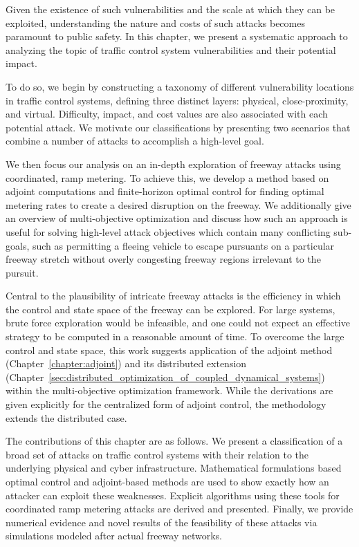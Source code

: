 Given the existence of such vulnerabilities and the scale at which they can be exploited, understanding the nature and costs of such attacks becomes paramount to public safety. In this chapter, we present a systematic approach to analyzing the topic of traffic control system vulnerabilities and their potential impact.

To do so, we begin by constructing a taxonomy of different vulnerability locations in traffic control systems, defining three distinct layers: physical, close-proximity, and virtual. Difficulty, impact, and cost values are also associated with each potential attack.  We motivate our classifications by presenting two scenarios that combine a number of attacks to accomplish a high-level goal.

We then focus our analysis on an in-depth exploration of freeway attacks using coordinated, ramp metering. To achieve this, we develop a method based on adjoint computations and finite-horizon optimal control for finding optimal metering rates to create a desired disruption on the freeway. We additionally give an overview of multi-objective optimization and discuss how such an approach is useful for solving high-level attack objectives which contain many conflicting sub-goals, such as permitting a fleeing vehicle to escape pursuants on a particular freeway stretch without overly congesting freeway regions irrelevant to the pursuit.

Central to the plausibility of intricate freeway attacks is the efficiency in which the control and state space of the freeway can be explored. For large systems, brute force exploration would be infeasible, and one could not expect an effective strategy to be computed in a reasonable amount of time. To overcome the large control and state space, this work suggests application of the adjoint method (Chapter~\ref{chapter:adjoint}) and its distributed extension (Chapter~\ref{sec:distributed_optimization_of_coupled_dynamical_systems}) within the multi-objective optimization framework. While the derivations are given explicitly for the centralized form of adjoint control, the methodology extends the distributed case.

The contributions of this chapter are as follows. We present a classification of a broad set of attacks on traffic control systems with their relation to the underlying physical and cyber infrastructure. Mathematical formulations based optimal control and adjoint-based methods are used to show exactly how an attacker can exploit these weaknesses. Explicit algorithms using these tools for coordinated ramp metering attacks are derived and presented. Finally, we provide numerical evidence and novel results of the feasibility of these attacks via simulations modeled after actual freeway networks.

